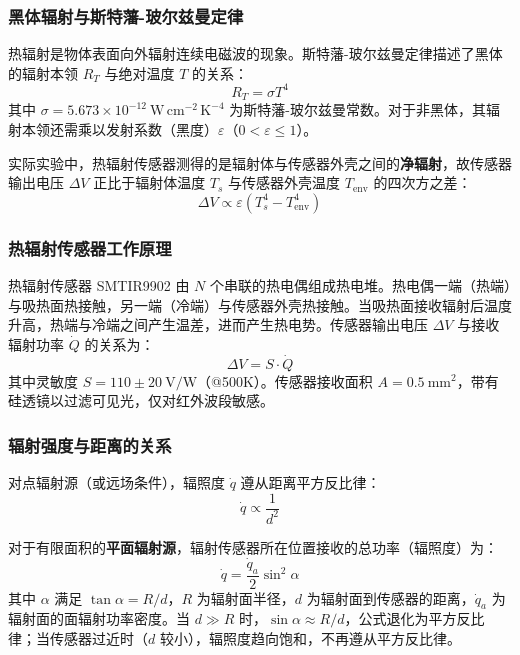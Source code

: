 \documentclass[dvipsnames, svgnames,a4paper,11pt]{article}
\begin{document}
\subsubsection{黑体辐射与斯特藩-玻尔兹曼定律}

热辐射是物体表面向外辐射连续电磁波的现象。斯特藩-玻尔兹曼定律描述了黑体的辐射本领 $R_T$ 与绝对温度 $T$ 的关系：
\begin{equation}
    R_T = \sigma T^4
\end{equation}
其中 $\sigma = 5.673 \times 10^{-12}\ \mathrm{W\,cm^{-2}\,K^{-4}}$ 为斯特藩-玻尔兹曼常数。对于非黑体，其辐射本领还需乘以发射系数（黑度）$\varepsilon$（$0 < \varepsilon \leq 1$）。

实际实验中，热辐射传感器测得的是辐射体与传感器外壳之间的\textbf{净辐射}，故传感器输出电压 $\Delta V$ 正比于辐射体温度 $T_s$ 与传感器外壳温度 $T_{\mathrm{env}}$ 的四次方之差：
\begin{equation}
    \Delta V \propto \varepsilon (T_s^4 - T_{\mathrm{env}}^4)
\end{equation}

\subsubsection{热辐射传感器工作原理}

热辐射传感器 SMTIR9902 由 $N$ 个串联的热电偶组成热电堆。热电偶一端（热端）与吸热面热接触，另一端（冷端）与传感器外壳热接触。当吸热面接收辐射后温度升高，热端与冷端之间产生温差，进而产生热电势。传感器输出电压 $\Delta V$ 与接收辐射功率 $\dot{Q}$ 的关系为：
\begin{equation}
    \Delta V = S \cdot \dot{Q}
\end{equation}
其中灵敏度 $S = 110 \pm 20\ \mathrm{V/W}$（@500K）。传感器接收面积 $A = 0.5\ \mathrm{mm^2}$，带有硅透镜以过滤可见光，仅对红外波段敏感。

\subsubsection{辐射强度与距离的关系}

对点辐射源（或远场条件），辐照度 $\dot{q}$ 遵从距离平方反比律：
\begin{equation}
    \dot{q} \propto \frac{1}{d^2}
\end{equation}

对于有限面积的\textbf{平面辐射源}，辐射传感器所在位置接收的总功率（辐照度）为：
\begin{equation}
    \dot{q} = \frac{\dot{q}_a}{2} \sin^2\alpha
\end{equation}
其中 $\alpha$ 满足 $\tan\alpha = R/d$，$R$ 为辐射面半径，$d$ 为辐射面到传感器的距离，$\dot{q}_a$ 为辐射面的面辐射功率密度。当 $d \gg R$ 时，$\sin\alpha \approx R/d$，公式退化为平方反比律；当传感器过近时（$d$ 较小），辐照度趋向饱和，不再遵从平方反比律。
\end{document}
